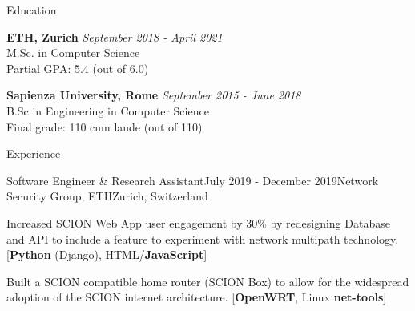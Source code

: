 \documentclass{resume}
\begin{document}

\printname
{}

\begin{rSection}{Education}

{\bf ETH, Zurich} \hfill {\em September 2018 - April 2021} \\ 
M.Sc. in Computer Science\\
Partial GPA: 5.4 (out of 6.0)

{\bf Sapienza University, Rome} \hfill {\em September 2015 - June 2018} \\ 
B.Sc in Engineering in Computer Science\\
Final grade: 110 cum laude (out of 110)

\end{rSection}


\begin{rSection}{Experience}

  \begin{rSubsection}{Software Engineer \& Research Assistant}{July 2019 - December 2019}{Network Security Group, ETH}{Zurich, Switzerland}
  \item Increased SCION Web App user engagement by 30\% by redesigning Database and API to include a feature to experiment with network multipath technology.  [\textbf{Python} (Django), HTML/\textbf{JavaScript}]
  \item Built a SCION compatible home router (SCION Box) to allow for the widespread adoption of the SCION internet architecture. [\textbf{OpenWRT}, Linux \textbf{net-tools}]
  \end{rSubsection}

\end{rSection}
\end{document}
